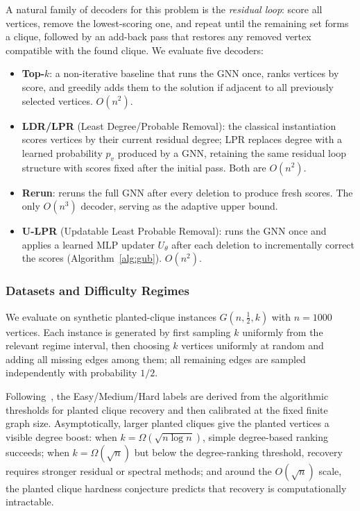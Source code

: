 \documentclass[journal,article,submit,pdftex,moreauthors]{Definitions/mdpi}
\begin{document}
A natural family of decoders for this problem is the \emph{residual loop}: score all
vertices, remove the lowest-scoring one, and repeat until the remaining set forms a
clique, followed by an add-back pass that restores any removed vertex compatible with
the found clique. We evaluate five decoders:
\begin{itemize}
  \item \textbf{Top-$k$}: a non-iterative baseline that runs the GNN once, ranks
    vertices by score, and greedily adds them to the solution if adjacent to all
    previously selected vertices. $O(n^2)$.
  \item \textbf{LDR/LPR} (Least Degree/Probable Removal): the classical
    instantiation scores vertices by their current residual degree; LPR replaces
    degree with a learned probability $p_v$ produced by a GNN, retaining the same
    residual loop structure with scores fixed after the initial pass. Both are
    $O(n^2)$.
  \item \textbf{Rerun}: reruns the full GNN after every deletion to produce fresh
    scores. The only $O(n^3)$ decoder, serving as the adaptive upper bound.
  \item \textbf{U-LPR} (Updatable Least Probable Removal): runs the GNN once and
    applies a learned MLP updater $U_\theta$ after each deletion to incrementally
    correct the scores (Algorithm~\ref{alg:gub}). $O(n^2)$.
\end{itemize}

\subsubsection{Datasets and Difficulty Regimes}

We evaluate on synthetic planted-clique instances $G(n,\tfrac{1}{2},k)$ with
$n=1000$ vertices. Each instance is generated by first sampling $k$ uniformly from
the relevant regime interval, then choosing $k$ vertices uniformly at random and
adding all missing edges among them; all remaining edges are sampled independently
with probability $1/2$.

Following~\citet{shoham2026ltr}, the Easy/Medium/Hard labels are derived from the
algorithmic thresholds for planted clique recovery and then calibrated at the fixed
finite graph size. Asymptotically, larger planted cliques give the planted vertices
a visible degree boost: when $k=\Omega(\sqrt{n\log n})$, simple degree-based
ranking succeeds; when $k=\Omega(\sqrt n)$ but below the degree-ranking threshold,
recovery requires stronger residual or spectral methods; and around the
$O(\sqrt n)$ scale, the planted clique hardness conjecture predicts that recovery
is computationally intractable.
\end{document}
